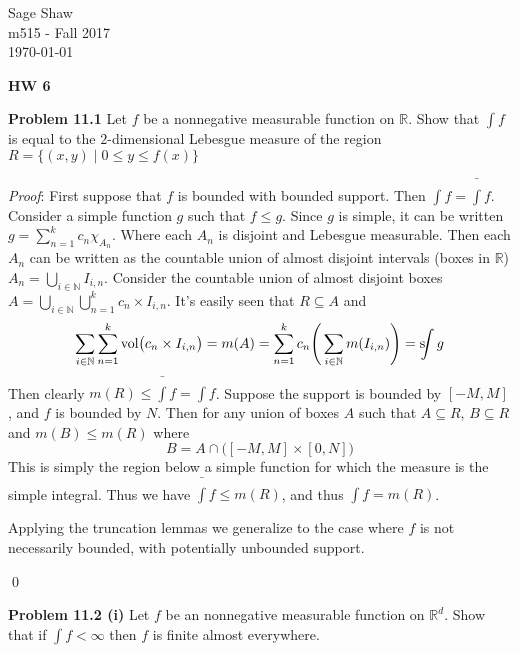 \documentclass[12pt]{article}
\newcommand{\problem}[1]{\hspace{-4 ex} \large \textbf{Problem #1} }
\newcommand{\sint}{\text{s}\kern-5pt\int}
\renewenvironment{proof}{\hspace{-4 ex} \emph{Proof}:}{\qed}
\begin{document}
	\thispagestyle{empty}
	
	\begin{flushright}
		Sage Shaw \\
		m515 - Fall 2017 \\
		\today
	\end{flushright}
	
{\large \textbf{HW 6}}\bigbreak

\problem{11.1} Let $f$ be a nonnegative measurable function on $\mathbb{R}$. Show that $\int f$ is equal to the $2$-dimensional Lebesgue measure of the region $R = \{(x,y)\mid 0\leq y \leq f(x) \}$
	
	\begin{proof}
		First suppose that $f$ is bounded with bounded support. Then $\int f = \bar{\int} f$. Consider a simple function $g$ such that $f \leq g$. Since $g$ is simple, it can be written $g = \sum\limits_{n=1}^k c_n \chi_{A_n}$. Where each $A_n$ is disjoint and Lebesgue measurable. Then each $A_n$ can be written as the countable union of almost disjoint intervals (boxes in $\mathbb{R}$) $A_n = \bigcup\limits_{i \in \mathbb{N}}I_{i,n}$. Consider the countable union of almost disjoint boxes $A = \bigcup\limits_{i \in \mathbb{N}} \bigcup\limits_{n=1}^k c_n \times I_{i,n}$. It's easily seen that $R \subseteq A$ and 
		$$
		\sum\limits_{i \in \mathbb{N}} \sum\limits_{n=1}^k \text{vol}\big( c_n \times I_{i,n} \big) = m(A) =  \sum\limits_{n=1}^k c_n \Bigg( \sum\limits_{i \in \mathbb{N}} m(I_{i,n}) \Bigg) = \sint g
		$$
		Then clearly $m(R) \leq \bar{\int}f = \int f$. Suppose the support is bounded by $[-M,M]$, and $f$ is bounded by $N$. Then for any union of boxes $A$ such that $A \subseteq R$, $B \subseteq R$ and $m(B) \leq m(R)$ where
		$$
		B =  A \cap \big([-M,M] \times [0,N] \big)
		$$
		This is simply the region below a simple function for which the measure is the simple integral. Thus we have $\bar{\int}f \leq m(R)$, and thus $\int f = m(R)$. \bigbreak
		
		 Applying the truncation lemmas we generalize to the case where $f$ is not necessarily bounded, with potentially unbounded support.
		
		
	\end{proof}

\problem{11.2 (i)} Let $f$ be an nonnegative measurable function on $\mathbb{R}^d$. Show that if $\int f<\infty$ then $f$ is finite almost everywhere.
\end{document}
